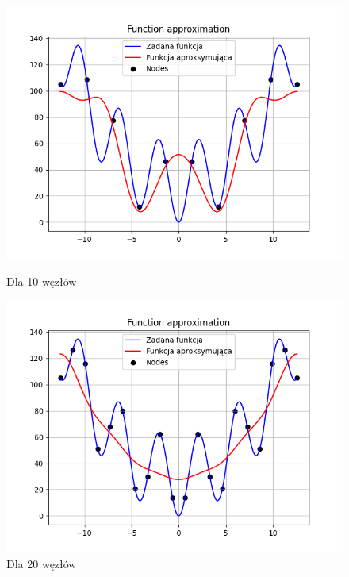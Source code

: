 \documentclass{article}
\begin{document}
\begin{figure}[H]
  \begin{minipage}[b]{0.49\textwidth}
    \begin{minipage}[b]{\textwidth}
      \includegraphics[width=\textwidth]{img29.png}
      \caption{Dla 10 węzłów}
    \end{minipage}
    \vspace*{\fill}
    \begin{minipage}[b]{\textwidth}
      \includegraphics[width=\textwidth]{img30.png}
      \caption{Dla 20 węzłów}
    \end{minipage}
  \end{minipage}
  \hfill
  \begin{minipage}[b]{0.49\textwidth}

\end{minipage}
\end{figure}
\end{document}
